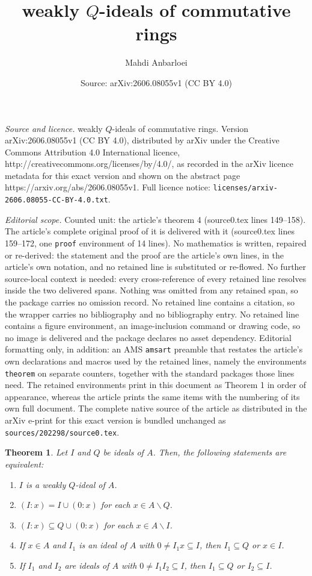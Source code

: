 \documentclass[10pt,a4paper]{amsart}
\title{weakly $Q$-ideals of commutative rings}
\author{Mahdi Anbarloei}
\date{Source: arXiv:2606.08055v1 (CC BY 4.0)}
\newtheorem{theorem}{Theorem}
\begin{document}
\maketitle

\noindent\emph{Source and licence.} weakly $Q$-ideals of commutative rings. Version arXiv:2606.08055v1 (CC BY 4.0), distributed by arXiv under the Creative Commons Attribution 4.0 International licence, http://creativecommons.org/licenses/by/4.0/, as recorded in the arXiv licence metadata for this exact version and shown on the abstract page https://arxiv.org/abs/2606.08055v1. Full licence notice: \texttt{licenses/arxiv-2606.08055-CC-BY-4.0.txt}.\par\smallskip

\noindent\textit{Editorial scope.} Counted unit: the article's theorem 4 (source0.tex lines 149--158). The article's complete original proof of it is delivered with it (source0.tex lines 159--172, one \texttt{proof} environment of 14 lines). No mathematics is written, repaired or re-derived: the statement and the proof are the article's own lines, in the article's own notation, and no retained line is substituted or re-flowed.  No further source-local context is needed: every cross-reference of every retained line resolves inside the two delivered spans.  Nothing was omitted from any retained span, so the package carries no omission record.  No retained line contains a citation, so the wrapper carries no bibliography and no bibliography entry.  No retained line contains a figure environment, an image-inclusion command or drawing code, so no image is delivered and the package declares no asset dependency.  Editorial formatting only, in addition: an AMS \texttt{amsart} preamble that restates the article's own declarations and macros used by the retained lines, namely the environments \texttt{theorem} on separate counters, together with the standard packages those lines need.  The retained environments print in this document as Theorem 1 in order of appearance, whereas the article prints the same items with the numbering of its own full document.  The complete native source of the article as distributed in the arXiv e-print for this exact version is bundled unchanged as \texttt{sources/202298/source0.tex}.
\begin{theorem}\label{4}
Let $I$ and $Q$ be  ideals  of $A$. Then, the following statements are equivalent:
\begin{enumerate}
\item $I$ is a weakly $Q$-ideal of $A$.
\item $(I:x)=I \cup (0:x)$ for each $x \in A \backslash  Q$.
\item $(I:x) \subseteq Q \cup (0:x)$ for each $x \in A \backslash I$.
\item If $x \in A$ and $I_1$ is an ideal of $A$ with $0 \neq I_1x\subseteq I$, then $I_1 \subseteq Q$ or $x \in I$.
\item If $I_1$ and $I_2$ are ideals of $A$ with $0 \neq I_1I_2 \subseteq I$, then $I_1 \subseteq Q$ or $I_2 \subseteq I$.
\end{enumerate}
\end{theorem}
\end{document}
